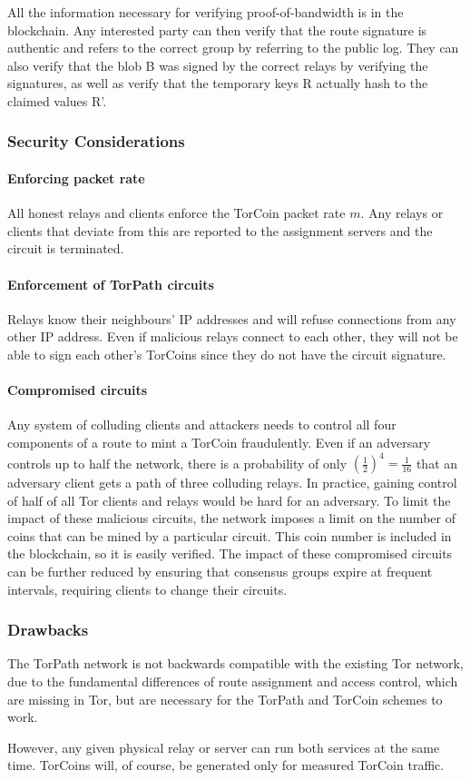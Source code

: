 All the information necessary for verifying proof-of-bandwidth is in the
blockchain. Any interested party can then verify that the route signature is
authentic and refers to the correct group by referring to the public log. They
can also verify that the blob B was signed by the correct relays by verifying
the signatures, as well as verify that the temporary keys R actually hash to
the claimed values R'.

\subsubsection{Security Considerations}

\paragraph{Enforcing packet rate} All honest relays and clients
enforce the TorCoin packet rate $m$. Any relays or clients that deviate from this
are reported to the assignment servers and the circuit is terminated.

\paragraph{Enforcement of TorPath circuits} Relays know their neighbours'
IP addresses and will refuse connections from any other IP address. Even if
malicious relays connect to each other, they will not be able to sign each
other's TorCoins since they do not have the circuit signature.

\paragraph{Compromised circuits} Any system of colluding clients and
attackers needs to control all four components of a route to mint a TorCoin
fraudulently. Even if an adversary controls up to half the network, there is a
probability of only $(\frac{1}{2})^4 = \frac{1}{16}$ that an adversary client
gets a path of three colluding relays. In practice, gaining control of half of
all Tor clients and relays would be hard for an adversary.  To limit the
impact of these malicious circuits, the network imposes a limit on the number
of coins that can be mined by a particular circuit. This coin number is
included in the blockchain, so it is easily verified. 
The impact of these
compromised circuits can be further reduced by ensuring that consensus groups
expire at frequent intervals, requiring clients to change their circuits.

\subsubsection{Drawbacks} The TorPath network is not backwards compatible with
the existing Tor network, due to the fundamental differences of route
assignment and access control, which are missing in Tor, but are necessary for
the TorPath and TorCoin schemes to work.

However, any given physical relay or server can run both services at the same
time. TorCoins will, of course, be generated only for measured TorCoin
traffic.
